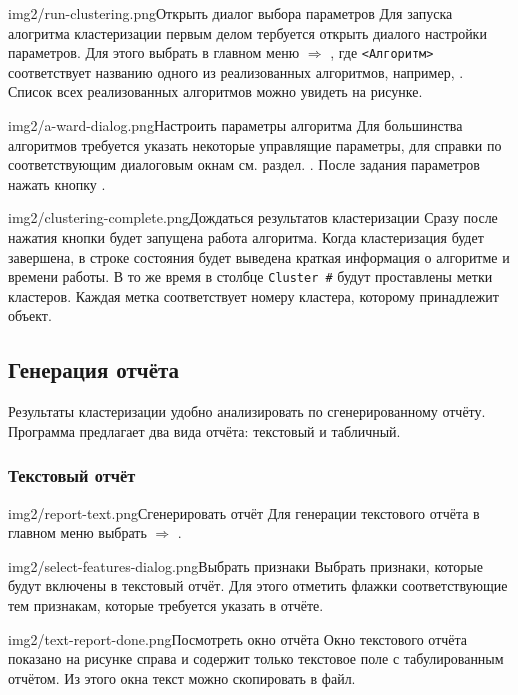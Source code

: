 \documentclass[12pt,tikz]{instruction}
\begin{document}
\begin{steps}
	\begin{ist}{img2/run-clustering.png}{Открыть диалог выбора параметров}
		Для запуска алогритма кластеризации первым делом тербуется открыть диалого настройки параметров. Для этого выбрать в главном меню  $\Rightarrow$ , где \texttt{<Алгоритм>} соответствует названию одного из реализованных алгоритмов, например, \AWard. Список всех реализованных алгоритмов можно увидеть на рисунке.
	\end{ist}
	\begin{ist}{img2/a-ward-dialog.png}{Настроить параметры алгоритма}
		Для большинства алгоритмов требуется указать некоторые управлящие параметры, для справки по соответствующим диалоговым окнам см. раздел. . После задания параметров нажать кнопку .
	\end{ist}
	\begin{ist}{img2/clustering-complete.png}{Дождаться результатов кластеризации}
		Сразу после нажатия кнопки  будет запущена работа алгоритма.
		Когда кластеризация будет завершена, в строке состояния будет выведена краткая информация о алгоритме и времени работы. В то же время в столбце \texttt{Cluster \#} будут проставлены метки кластеров. Каждая метка соответствует номеру кластера, которому принадлежит объект.
	\end{ist}
		
\end{steps}

\subsection{Генерация отчёта}
\label{subsec:report}
Результаты кластеризации удобно анализировать по сгенерированному отчёту. Программа \SysName предлагает два вида отчёта: текстовый и табличный.

\subsubsection{Текстовый отчёт}
\begin{steps}
	\begin{ist}{img2/report-text.png}{Сгенерировать отчёт}
		Для генерации текстового отчёта в главном меню выбрать  $\Rightarrow$ .
	\end{ist}
	\begin{ist}{img2/select-features-dialog.png}{Выбрать признаки}
		Выбрать признаки, которые будут включены в текстовый отчёт. Для этого отметить флажки соответствующие тем признакам, которые требуется указать в отчёте. \vspace{2.5cm}
	\end{ist}
	
	\begin{ist}{img2/text-report-done.png}{Посмотреть окно отчёта}
		Окно текстового отчёта показано на рисунке справа и содержит только текстовое поле с табулированным отчётом. Из этого окна текст можно скопировать в файл.
	\end{ist}
		
\end{steps}
\end{document}
